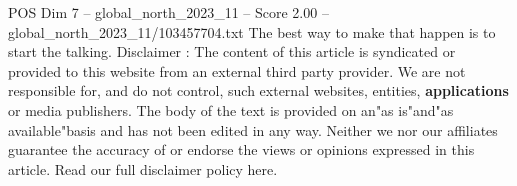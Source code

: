 \begin{textsample}{POS Dim 7 – global\_north\_2023\_11 – Score 2.00 – global\_north\_2023\_11/103457704.txt}
The best way to make that happen is to start the talking.
Disclaimer : The content of this article is syndicated or provided to this website from an external third party provider.
We are not responsible for, and do not control, such external websites, entities, \textbf{applications} or media publishers.
The body of the text is provided on an"as is"and"as available"basis and has not been edited in any way.
Neither we nor our affiliates guarantee the accuracy of or endorse the views or opinions expressed in this article.
Read our full disclaimer policy here.

\end{textsample}
